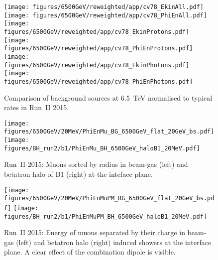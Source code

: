 \begin{figure}
\begin{center}
  \texttt{[image: figures/6500GeV/reweighted/app/cv78\_EkinAll.pdf]}
  \texttt{[image: figures/6500GeV/reweighted/app/cv78\_PhiEnAll.pdf]}
  \texttt{[image: figures/6500GeV/reweighted/app/cv78\_EkinProtons.pdf]}
  \texttt{[image: figures/6500GeV/reweighted/app/cv78\_PhiEnProtons.pdf]}
 \texttt{[image: figures/6500GeV/reweighted/app/cv78\_EkinPhotons.pdf]}
 \texttt{[image: figures/6500GeV/reweighted/app/cv78\_PhiEnPhotons.pdf]}
\end{center}
\vspace{-0.6cm}
 \caption{Comparison of background sources at 6.5~TeV normalised to typical rates in Run~II 2015.
  \label{compAllBKG_6.52}}
\end{figure}




\begin{figure}
\begin{center}
  \texttt{[image: figures/6500GeV/20MeV/PhiEnMu\_BG\_6500GeV\_flat\_20GeV\_bs.pdf]}
  \texttt{[image: figures/BH\_run2/b1/PhiEnMu\_BH\_6500GeV\_haloB1\_20MeV.pdf]}      
\end{center}
\vspace{-0.6cm}
 \caption{Run~II 2015: Muons sorted by radius in beam-gas (left) and betatron halo of B1 (right) at the inteface plane.
  \label{fig:PhiEnMu}}
\end{figure}



\begin{figure}
\begin{center}
  \texttt{[image: figures/6500GeV/20MeV/PhiEnMuPM\_BG\_6500GeV\_flat\_20GeV\_bs.pdf]}
    \texttt{[image: figures/BH\_run2/b1/PhiEnMuPM\_BH\_6500GeV\_haloB1\_20MeV.pdf]}            
\end{center}
\vspace{-0.6cm}
 \caption{Run~II 2015: Energy of muons separated by their charge in beam-gas (left) and betatron halo (right) induced showers at the interface plane. A clear effect of the combination dipole is visible. 
  \label{fig:PhiEnMuPM}}
\end{figure}


